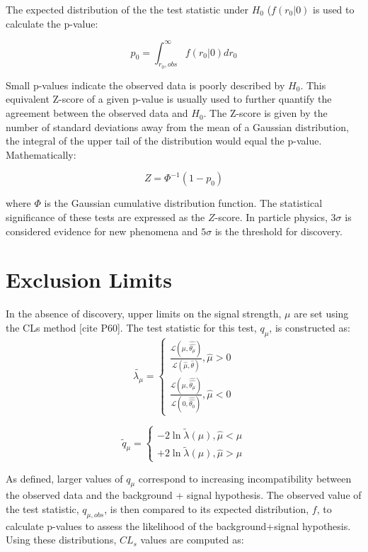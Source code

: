 The expected distribution of the the test statistic under $H_{0}$ ($f(r_{0}|0)$ is used to calculate the p-value:

\begin{equation}
p_{0}=\int_{r_0,obs}^{\infty} f(r_{0}|0)dr_{0}
\end{equation}

Small p-values indicate the observed data is poorly described by $H_{0}$. This equivalent Z-score of a given p-value is usually used to further quantify the agreement between the observed data and $H_{0}$. The Z-score is given by the number of standard deviations away from the mean of a Gaussian distribution, the integral of the upper tail of the distribution would equal the p-value. Mathematically:

\begin{equation}
Z = \Phi^{-1}(1-p_{0})
\end{equation}

where $\Phi$ is the Gaussian cumulative distribution function. The statistical significance of these tests are expressed as the $Z$-score. In particle physics, $3\sigma$ is considered evidence for new phenomena and $5\sigma$ is the threshold for discovery. 
\section{Exclusion Limits}
In the absence of discovery, upper limits on the signal strength, $\mu$ are set using the CLs method [cite P60]. The test statistic for this test, $q_{\mu}$, is constructed as:
\begin{equation}
\tilde{\lambda_{\mu}}=\left\{ \begin{array}{ll}
\frac{\mathcal{L}(\mu,\hat{\hat{\theta_{\mu}}})}{\mathcal{L}(\hat{\mu},\hat{\theta})},  \hat{\mu} > 0\\
\frac{\mathcal{L}(\mu,\hat{\hat{\theta_{\mu}}})}{\mathcal{L}(0,\hat{\hat{\theta_{0}}})},  \hat{\mu} < 0
\end{array} 
\right.
\end{equation}
 
 \begin{equation}
\tilde{q}_{\mu}=\left\{ \begin{array}{ll}
-2\ln \tilde{\lambda}(\mu),  \hat{\mu} < \mu \\
+2\ln \tilde{\lambda}(\mu),  \hat{\mu} > \mu 
\end{array}
\right.
\end{equation}
 
As defined, larger values of $q_{\mu}$ correspond to increasing incompatibility between the observed data and the background + signal hypothesis. The observed value of the test statistic, $q_{\mu, obs}$, is then compared to its expected distribution, $f$, to calculate p-values to assess the likelihood of the background+signal hypothesis. Using these distributions, $CL_{s}$ values are computed as:
 
